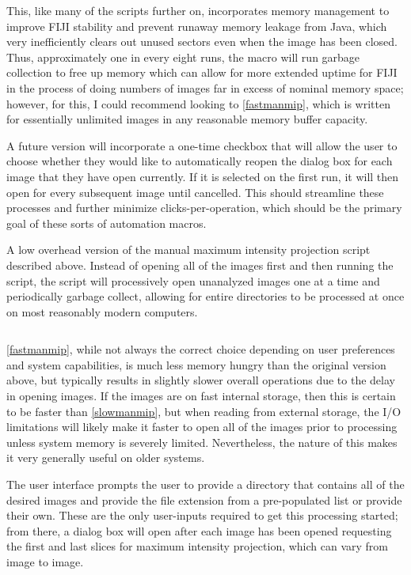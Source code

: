 This, like many of the scripts further on, incorporates memory management to improve FIJI stability and prevent runaway memory leakage from Java, which very inefficiently clears out unused sectors even when the image has been closed. Thus, approximately one in every eight runs, the macro will run garbage collection to free up memory which can allow for more extended uptime for FIJI in the process of doing numbers of images far in excess of nominal memory space; however, for this, I could recommend looking to \autoref{fastmanmip}, which is written for essentially unlimited images in any reasonable memory buffer capacity.

A future version will incorporate a one-time checkbox that will allow the user to choose whether they would like to automatically reopen the dialog box for each image that they have open currently. If it is selected on the first run, it will then open for every subsequent image until cancelled. This should streamline these processes and further minimize clicks-per-operation, which should be the primary goal of these sorts of automation macros.

\begin{code}
\caption{A low overhead version of the manual maximum intensity projection script described above. Instead of opening all of the images first and then running the script, the script will processively open unanalyzed images one at a time and periodically garbage collect, allowing for entire directories to be processed at once on most reasonably modern computers.}
\label{fastmanmip}

\inputminted[breaklines,frame=single,fontsize=\small]{python}{source/fast_manMIPper.py}

\end{code}

\autoref{fastmanmip}, while not always the correct choice depending on user preferences and system capabilities, is much less memory hungry than the original version above, but typically results in slightly slower overall operations due to the delay in opening images. If the images are on fast internal storage, then this is certain to be faster than \autoref{slowmanmip}, but when reading from external storage, the I/O limitations will likely make it faster to open all of the images prior to processing unless system memory is severely limited. Nevertheless, the nature of this makes it very generally useful on older systems.

The user interface prompts the user to provide a directory that contains all of the desired images and provide the file extension from a pre-populated list or provide their own. These are the only user-inputs required to get this processing started; from there, a dialog box will open after each image has been opened requesting the first and last slices for maximum intensity projection, which can vary from image to image.

